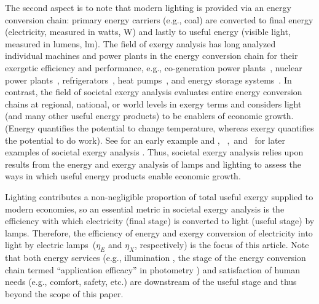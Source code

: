 \documentclass[energies,article,accept,moreauthors,pdftex]{Definitions/mdpi}\usepackage[]{graphicx}\usepackage[]{color}
\newcommand{\ins}[1]{#1}
\newcommand{\rev}[2]{#2}
\providecommand{\DIFaddbegin}{} %
\providecommand{\DIFaddend}{} %
\providecommand{\DIFdelbegin}{} %
\providecommand{\DIFdelend}{} %
\newcommand{\DIFscaledelfig}{0.5}
\newlength{\DIFdelgraphicswidth} %
\newlength{\DIFdelgraphicsheight} %
\newcommand{\DIFaddincludegraphics}[2][]{{\color{blue}\fbox{\DIFOincludegraphics[#1]{#2}}}} %
\newcommand{\DIFdelincludegraphics}[2][]{%
\sbox{\DIFdelgraphicsbox}{\DIFOincludegraphics[#1]{#2}}%
\settoboxwidth{\DIFdelgraphicswidth}{\DIFdelgraphicsbox} %
\settoboxtotalheight{\DIFdelgraphicsheight}{\DIFdelgraphicsbox} %
\scalebox{\DIFscaledelfig}{%
\parbox[b]{\DIFdelgraphicswidth}{\usebox{\DIFdelgraphicsbox}\\[-\baselineskip] \rule{\DIFdelgraphicswidth}{0em}}\llap{\resizebox{\DIFdelgraphicswidth}{\DIFdelgraphicsheight}{%
\setlength{\unitlength}{\DIFdelgraphicswidth}%
\begin{picture}(1,1)%
\thicklines\linethickness{2pt} %
{\color[rgb]{1,0,0}\put(0,0){\framebox(1,1){}}}%
{\color[rgb]{1,0,0}\put(0,0){\line( 1,1){1}}}%
{\color[rgb]{1,0,0}\put(0,1){\line(1,-1){1}}}%
\end{picture}%
}\hspace*{3pt}}} %
} %
\DeclareRobustCommand{\DIFaddbegin}{\DIFOaddbegin \let\includegraphics\DIFaddincludegraphics} %
\DeclareRobustCommand{\DIFaddend}{\DIFOaddend \let\includegraphics\DIFOincludegraphics} %
\DeclareRobustCommand{\DIFdelbegin}{\DIFOdelbegin \let\includegraphics\DIFdelincludegraphics} %
\DeclareRobustCommand{\DIFdelend}{\DIFOaddend \let\includegraphics\DIFOincludegraphics} %
\begin{document}
The second aspect is to note that 
modern lighting is provided via an energy conversion chain:
primary energy \DIFaddbegin \ins{carriers} \DIFaddend (e.g., coal) \DIFdelbegin \DIFdelend \DIFaddbegin {are} \DIFaddend converted to
final energy (electricity, measured in watts, W) and lastly to
useful energy (visible light, measured in lumens, lm).
\DIFdelbegin \DIFdelend \DIFaddbegin \ins{The field of exergy analysis has long analyzed individual machines
and power plants in the energy conversion chain 
for their exergetic efficiency and performance, e.g.,
co-generation power plants~\cite{Bejan:1996},
nuclear power plants~\cite{Durmayaz:2001}, 
refrigerators~\cite{joybari2013exergy},
heat pumps~\cite{bobbo2019energetic}, and 
energy storage systems~\cite{zwierzchowski2020energy}.
In contrast,} the  field of societal exergy analysis evaluates entire energy conversion chains
at regional, national, or world levels in exergy terms and
considers light (and many other useful energy products)
to be enablers of economic growth.
(Energy quantifies the potential to change temperature,
whereas exergy quantifies the potential to do work).
 See \citet{Nakicenovic1996} for an early example and
\ins{\citet{Guevara:2016a},}
\mbox{%
\citet{Heun:2019aa}, and \citet{Ver-Beek:2020aa}} for later examples
 of societal exergy analysis%
.
Thus, societal exergy analysis 
relies upon results from the energy and exergy analysis of 
lamps and lighting to assess the ways in which useful energy products 
enable economic growth.


Lighting contributes a non-negligible proportion of total useful exergy
supplied to modern economies, so
an essential metric in societal exergy analysis
is the efficiency with which
electricity (final stage) is converted to light (useful stage) by lamps.
Therefore, the efficiency of energy and exergy conversion of electricity
into light by electric lamps~($\eta_E$ and $\eta_X$, respectively)
is the focus of this article.
Note that both energy services (e.g., illumination\DIFdelbegin %
, the stage of the energy conversion chain
termed ``application efficacy'' in photometry 
\cite{rea2001application}) 
and satisfaction of human needs
(e.g., comfort, safety, etc.) are downstream of the useful stage 
and thus \DIFdelbegin %
{beyond the scope of this paper}.
\end{document}
